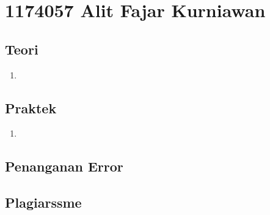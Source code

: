 \section{1174057 Alit Fajar Kurniawan}
	\subsection{Teori}
		\begin{enumerate}
			\item
		\end{enumerate}

	\subsection{Praktek}
		\begin{enumerate}
			\item
		\end{enumerate}

	\subsection{Penanganan Error}

	\subsection{Plagiarssme}
